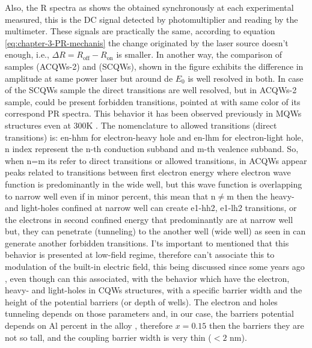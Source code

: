 Also, the R spectra as shows the   obtained synchronously at each experimental measured, this is the DC signal detected by photomultiplier and reading by the multimeter. These signals are practically the same, according to equation \cref{eq:chapter-3-PR-mechanis}  the change originated by the laser source doesn't enough, i.e., $\Delta R= R_{\mathrm{off}}- R_{\mathrm{on}}$ is smaller. 
In another way, the comparison of samples  (ACQWs-2) and  (SCQWs), shown in the figure  exhibits the difference in amplitude at same power laser but around de $E_0$ is well resolved in both. In case of the SCQWs sample  the direct transitions are well resolved, but in ACQWs-2 sample, could be present forbidden transitions, pointed at  with same color of its correspond PR spectra. This behavior it has been observed previously\cite{fox1991excitonic} in MQWs structures even at 300K \cite{shen1986observation}. The nomenclature to allowed transitions  (direct transitions) is: en-hhm for electron-heavy hole and en-lhm for electron-light hole, n index represent the n-th conduction subband and m-th  vealence subband. So, when n=m its refer to direct transitions or allowed transitions, in ACQWs appear peaks related to transitions between first electron energy where electron wave function is predominantly in the wide well, but this wave function is overlapping to narrow well even if in minor percent, this mean that $\mathrm{n\neq m} $ then the heavy- and light-holes confined at narrow well can create e1-hh2, e1-lh2 transitions, or the electrons in second confined energy that  predominantly  are at narrow well but, they can penetrate (tunneling)   to the  another well (wide well) as seen in     can generate  another forbidden transitions. 
I'ts important to mentioned that this behavior is presented at low-field regime, therefore can't associate this to modulation of the built-in electric field, this being discussed since some years ago \cite{shen1986observation,shen1987photoreflectance}, even though can this associated, with the behavior which have the  electron, heavy- and light-holes in CQWs structures, with a specific barrier width and the height of the potential barriers  (or depth of wells)\cite{fang1988allowed,sivalertporn2016effectofbarrier}. The electron and holes tunneling depends on those parameters and, in our case, the barriers potential depends on Al percent in the alloy \algaas, therefore $x=0.15$ then the barriers they are not so tall, and the coupling barrier width is very thin ($< 2$ nm). \\
